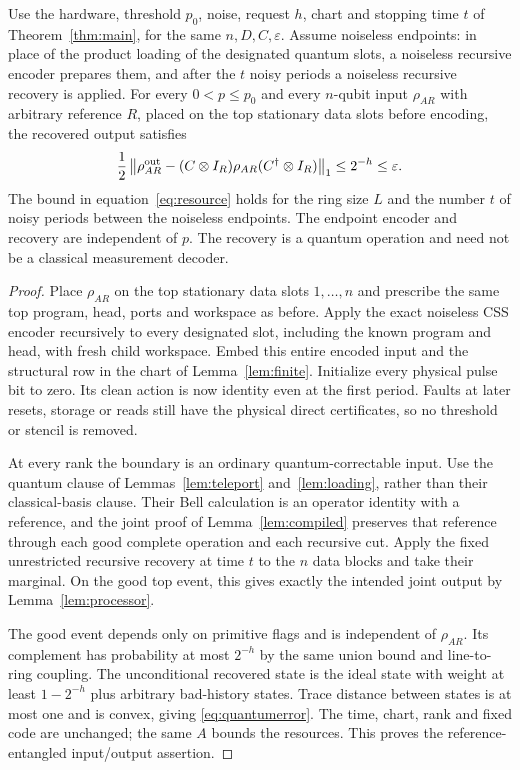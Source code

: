 \begin{maintheorem}\label{thm:quantum}
Use the hardware, threshold $p_0$, noise, request $h$, chart and stopping time $t$ of Theorem~\ref{thm:main}, for the same $n,D,C,\varepsilon$. Assume noiseless endpoints: in place of the product loading of the designated quantum slots, a noiseless recursive encoder prepares them, and after the $t$ noisy periods a noiseless recursive recovery is applied. For every $0<p\le p_0$ and every $n$-qubit input $\rho_{AR}$ with arbitrary reference $R$, placed on the top stationary data slots before encoding, the recovered output satisfies
\begin{equation}\label{eq:quantumerror}
 \frac12\left\|\rho^{\rm out}_{AR}
 -(C\otimes I_R)\rho_{AR}(C^\dagger\otimes I_R)\right\|_1
 \le2^{-h}\le\varepsilon.
\end{equation}
The bound in equation~\eqref{eq:resource} holds for the ring size $L$ and the number $t$ of noisy periods between the noiseless endpoints. The endpoint encoder and recovery are independent of $p$. The recovery is a quantum operation and need not be a classical measurement decoder.
\end{maintheorem}
\begin{proof}
Place $\rho_{AR}$ on the top stationary data slots $1,\ldots,n$ and prescribe the same top program, head, ports and workspace as before. Apply the exact noiseless CSS encoder recursively to every designated slot, including the known program and head, with fresh child workspace. Embed this entire encoded input and the structural row in the chart of Lemma~\ref{lem:finite}. Initialize every physical pulse bit to zero. Its clean action is now identity even at the first period. Faults at later resets, storage or reads still have the physical direct certificates, so no threshold or stencil is removed.

At every rank the boundary is an ordinary quantum-correctable input. Use the quantum clause of Lemmas~\ref{lem:teleport} and~\ref{lem:loading}, rather than their classical-basis clause. Their Bell calculation is an operator identity with a reference, and the joint proof of Lemma~\ref{lem:compiled} preserves that reference through each good complete operation and each recursive cut. Apply the fixed unrestricted recursive recovery at time $t$ to the $n$ data blocks and take their marginal. On the good top event, this gives exactly the intended joint output by Lemma~\ref{lem:processor}.

The good event depends only on primitive flags and is independent of $\rho_{AR}$. Its complement has probability at most $2^{-h}$ by the same union bound and line-to-ring coupling. The unconditional recovered state is the ideal state with weight at least $1-2^{-h}$ plus arbitrary bad-history states. Trace distance between states is at most one and is convex, giving \eqref{eq:quantumerror}. The time, chart, rank and fixed code are unchanged; the same $A$ bounds the resources. This proves the reference-entangled input/output assertion.
\end{proof}

